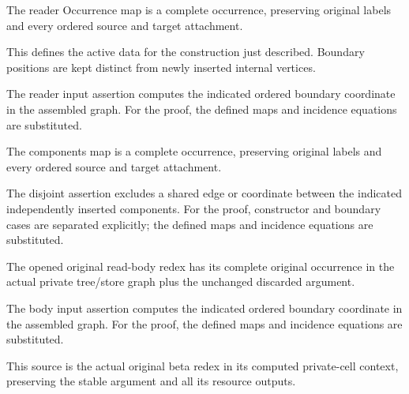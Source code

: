 The reader Occurrence map is a complete occurrence, preserving original labels and every ordered source and target attachment.
\par{}

This defines the active data for the construction just described. Boundary positions are kept distinct from newly inserted internal vertices.
\par{}

The reader input assertion computes the indicated ordered boundary coordinate in the assembled graph.
For the proof, the defined maps and incidence equations are substituted.
\par{}

The components map is a complete occurrence, preserving original labels and every ordered source and target attachment.
\par{}

The disjoint assertion excludes a shared edge or coordinate between the indicated independently inserted components.
For the proof, constructor and boundary cases are separated explicitly; the defined maps and incidence equations are substituted.
\par{}

The opened original read-body redex has its complete original occurrence in the actual private tree/store graph plus the unchanged discarded argument.
\par{}

The body input assertion computes the indicated ordered boundary coordinate in the assembled graph.
For the proof, the defined maps and incidence equations are substituted.
\par{}

This source is the actual original beta redex in its computed private-cell context, preserving the stable argument and all its resource outputs.
\par{}

